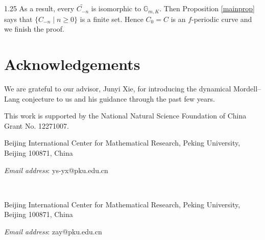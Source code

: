 \documentclass[12pt]{article}
\newcommand\address[1]{#1}
\newcommand\email[1]{\emph{Email address}: #1}
\begin{document}
\begin{spacing}{1.25}
As a result, every $\widetilde{C_{-n}}$ is isomorphic to $\mathbb{G}_{m,K}$. Then Proposition \ref{mainprop} says that $\{C_{-n}\mid n\geq0\}$ is a finite set. Hence $C_0=C$ is an $f$-periodic curve and we finish the proof.















\section*{Acknowledgements}
We are grateful to our advisor, Junyi Xie, for introducing the dynamical Mordell--Lang conjecture to us and his guidance through the past few years.

This work is supported by the National Natural Science Foundation of China Grant No. 12271007.





\address{Beijing International Center for Mathematical Research, Peking University, Beijing 100871, China}

\email{ys-yx@pku.edu.cn}

~

\address{Beijing International Center for Mathematical Research, Peking University, Beijing 100871, China}

\email{zay@pku.edu.cn}

\end{spacing}
\end{document}
